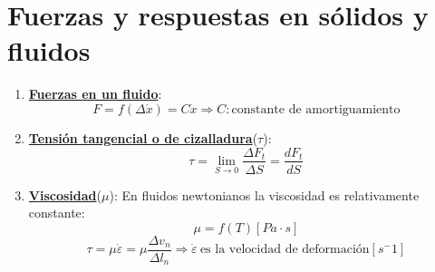 \section{Fuerzas y respuestas en sólidos y fluidos}
\begin{enumerate}
	\item \underline{\textbf{Fuerzas en un fluido}}:
	\[F=f(\Delta \dot{x})=C\dot{x} \Rightarrow C: \text{constante de amortiguamiento}\]
	
	\item \underline{\textbf{Tensión tangencial o de cizalladura}}($\tau$):
	\[\tau=\lim_{{S \to 0}} \frac{\Delta F_t}{\Delta S}=\frac{dF_t}{dS}\]
	\item \underline{\textbf{Viscosidad}}($\mu$):
	En fluidos newtonianos la viscosidad es relativamente constante: 
	\[\mu=f(T) [Pa \cdot s]\]
	\[\tau =\mu \dot{\varepsilon} = \mu \frac{\Delta v_n}{\Delta l_n} \Rightarrow \dot{\varepsilon}\ \text{es la velocidad de deformación} [s^-1]\]


\end{enumerate}
